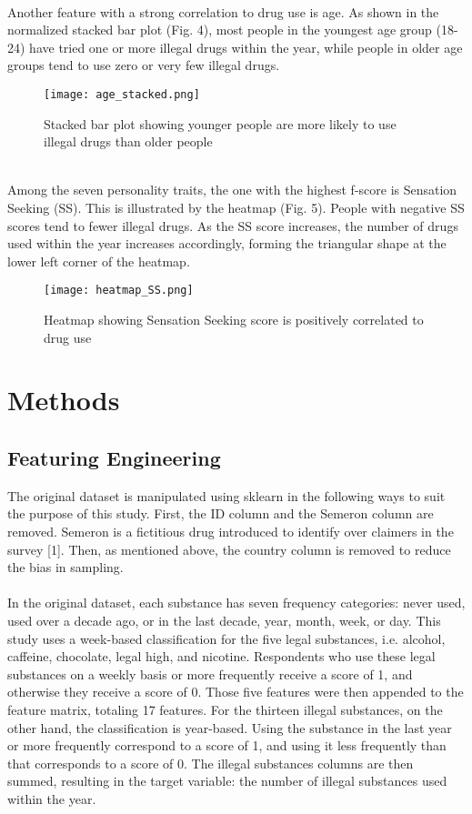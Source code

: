 \documentclass[12pt]{article}
\begin{document}
\pagebreak
\\
Another feature with a strong correlation to drug use is age. As shown in the normalized stacked bar plot (Fig. 4), most people in the youngest age group (18-24) have tried one or more illegal drugs within the year, while people in older age groups tend to use zero or very few illegal drugs. \\
\begin{figure}[!h]
\centering
\texttt{[image: age\_stacked.png]}
\caption{Stacked bar plot showing younger people are more likely to use illegal drugs than older people}
\end{figure}
\pagebreak
\\
Among the seven personality traits, the one with the highest f-score is Sensation Seeking (SS). This is illustrated by the heatmap (Fig. 5). People with negative SS scores tend to fewer illegal drugs. As the SS score increases, the number of drugs used within the year increases accordingly, forming the triangular shape at the lower left corner of the heatmap. 
\begin{figure}[!h]
\centering
\texttt{[image: heatmap\_SS.png]}
\caption{Heatmap showing Sensation Seeking score is positively correlated to drug use}
\end{figure}
	
\section{Methods}

\subsection{Featuring Engineering}
The original dataset is manipulated using sklearn in the following ways to suit the purpose of this study. First, the ID column and the Semeron column are removed. Semeron is a fictitious drug introduced to identify over claimers in the survey [1]. Then, as mentioned above, the country column is removed to reduce the bias in sampling.\\
\\
In the original dataset, each substance has seven frequency categories: never used, used over a decade ago, or in the last decade, year, month, week, or day. This study uses a week-based classification for the five legal substances, i.e. alcohol, caffeine, chocolate, legal high, and nicotine. Respondents who use these legal substances on a weekly basis or more frequently receive a score of 1, and otherwise they receive a score of 0. Those five features were then appended to the feature matrix, totaling 17 features. For the thirteen illegal substances, on the other hand, the classification is year-based. Using the substance in the last year or more frequently correspond to a score of 1, and using it less frequently than that corresponds to a score of 0. The illegal substances columns are then summed, resulting in the target variable: the number of illegal substances used within the year. 
\end{document}
